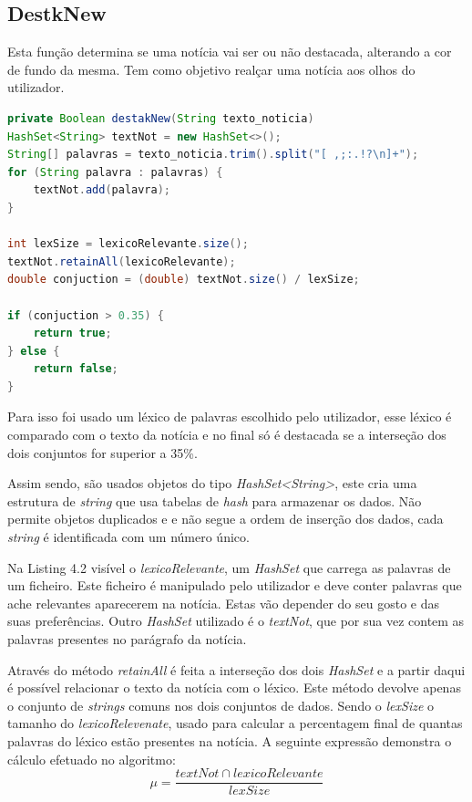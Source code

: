 \subsection{DestkNew}
Esta função determina se uma notícia vai ser ou não destacada, alterando a cor de fundo da mesma. Tem como objetivo realçar uma notícia aos olhos do utilizador. 

\begin{lstlisting}[language=JAVA, caption = Código usado para destacar notícia \label{code:imagens}]
private Boolean destakNew(String texto_noticia)
HashSet<String> textNot = new HashSet<>();
String[] palavras = texto_noticia.trim().split("[ ,;:.!?\n]+");
for (String palavra : palavras) {
    textNot.add(palavra);
}

int lexSize = lexicoRelevante.size();
textNot.retainAll(lexicoRelevante);
double conjuction = (double) textNot.size() / lexSize;

if (conjuction > 0.35) {
    return true;
} else {
    return false;
}    
\end{lstlisting}

Para isso foi usado um léxico de palavras escolhido pelo utilizador, esse léxico é comparado com o texto da notícia e no final só é destacada se a interseção dos dois conjuntos for superior a 35\%. \par
Assim sendo, são usados objetos do tipo \emph{HashSet<String>}, este cria uma estrutura de \emph{string} que usa tabelas de \emph{hash} para armazenar os dados. Não permite objetos duplicados e e não segue a ordem de inserção dos dados, cada \emph{string} é identificada com um número único. \par
Na Listing 4.2 visível o \emph{lexicoRelevante}, um \emph{HashSet} que carrega as palavras de um ficheiro. Este ficheiro é manipulado pelo utilizador e deve conter palavras que ache relevantes aparecerem na notícia. Estas vão depender do seu gosto e das suas preferências. Outro \emph{HashSet} utilizado é o \emph{textNot}, que por sua vez contem as palavras presentes no parágrafo da notícia.\par 
Através do método \emph{retainAll} é feita a interseção dos dois \emph{HashSet} e a partir daqui é possível relacionar o texto da notícia com o léxico. Este método devolve apenas o conjunto de \emph{strings} comuns nos dois conjuntos de dados. Sendo o \emph{lexSize} o tamanho do \emph{lexicoRelevenate}, usado para calcular a percentagem final de quantas palavras do léxico estão presentes na notícia.
A seguinte expressão demonstra o cálculo efetuado no algoritmo:
\begin{equation}
    \mu= \dfrac{textNot \cap lexicoRelevante}{lexSize}
\end{equation}

